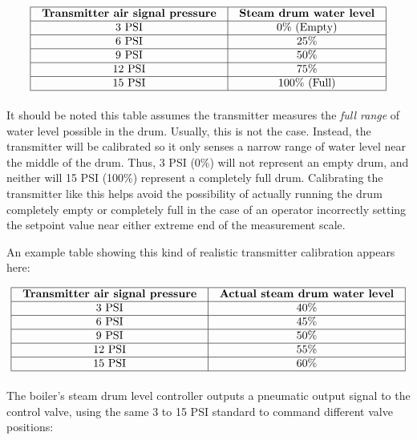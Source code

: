 $$\vbox{\offinterlineskip
\halign{\strut
\vrule \quad\hfil # \ \hfil & 
\vrule \quad\hfil # \ \hfil \vrule \cr
\noalign{\hrule}
%
\textbf{Transmitter air signal pressure} & \textbf{Steam drum water level} \cr
%
\noalign{\hrule}
%
3 PSI & 0\% (Empty) \cr
%
\noalign{\hrule}
%
6 PSI & 25\% \cr
%
\noalign{\hrule}
%
9 PSI & 50\%  \cr
%
\noalign{\hrule}
%
12 PSI & 75\% \cr
%
\noalign{\hrule}
%
15 PSI & 100\% (Full) \cr
%
\noalign{\hrule}
} %
}$$ %

It should be noted this table assumes the transmitter measures the \textit{full range} of water level possible in the drum.  Usually, this is not the case.  Instead, the transmitter will be calibrated so it only senses a narrow range of water level near the middle of the drum.  Thus, 3 PSI (0\%) will not represent an empty drum, and neither will 15 PSI (100\%) represent a completely full drum.  Calibrating the transmitter like this helps avoid the possibility of actually running the drum completely empty or completely full in the case of an operator incorrectly setting the setpoint value near either extreme end of the measurement scale.

An example table showing this kind of realistic transmitter calibration appears here:


$$\vbox{\offinterlineskip
\halign{\strut
\vrule \quad\hfil # \ \hfil & 
\vrule \quad\hfil # \ \hfil \vrule \cr
\noalign{\hrule}
%
\textbf{Transmitter air signal pressure} & \textbf{Actual steam drum water level} \cr
%
\noalign{\hrule}
%
3 PSI & 40\% \cr
%
\noalign{\hrule}
%
6 PSI & 45\% \cr
%
\noalign{\hrule}
%
9 PSI & 50\%  \cr
%
\noalign{\hrule}
%
12 PSI & 55\% \cr
%
\noalign{\hrule}
%
15 PSI & 60\% \cr
%
\noalign{\hrule}
} %
}$$ %

\vskip 10pt

\filbreak

The boiler's steam drum level controller outputs a pneumatic output signal to the control valve, using the same 3 to 15 PSI standard to command different valve positions:


